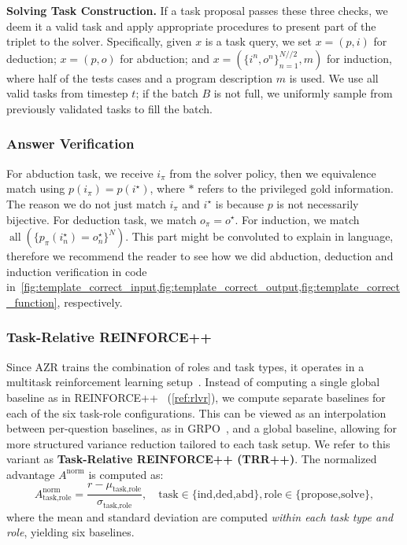 \documentclass{article}
\begin{document}
\textbf{Solving Task Construction.}
If a task proposal passes these three checks, we deem it a valid task and apply appropriate procedures to present part of the triplet to the solver. Specifically, given \(x\) is a task query, we set \(x = (p, i)\) for deduction; \(x = (p, o)\) for abduction; and \(x = (\{i^n, o^n\}^{N // 2}_{n=1}, m)\) for induction, where half of the tests cases and a program description $m$ is used. We use all valid tasks from timestep \(t\); if the batch \(B\) is not full, we uniformly sample from previously validated tasks to fill the batch.

\subsubsection{Answer Verification}
\label{sec:answer_verification}
For abduction task, we receive \(i_\pi\) from the solver policy, then we equivalence match using \(p(i_\pi)=p(i^\star)\), where \(*\) refers to the privileged gold information. The reason we do not just match \(i_\pi\) and \(i^\star\) is because \(p\) is not necessarily bijective. For deduction task, we match \(o_\pi=o^\star\). For induction, we match \(\operatorname{all}(\{p_\pi(i_n^\star)=o_n^\star\}^N)\). This part might be convoluted to explain in language, therefore we recommend the reader to see how we did abduction, deduction and induction verification in code in~\cref{fig:template_correct_input,fig:template_correct_output,fig:template_correct_function}, respectively.

\subsubsection{Task-Relative REINFORCE++}
\label{sec:trr}

Since AZR trains the combination of roles and task types, it operates in a multitask reinforcement learning setup~\citep{zhang2021survey,zhao2022mixture,wang2023train, yue2023understanding}. Instead of computing a single global baseline as in REINFORCE++~\citep{hu2025reinforce++} (\cref{ref:rlvr}), we compute separate baselines for each of the six task-role configurations. This can be viewed as an interpolation between per-question baselines, as in GRPO~\citep{Shao2024DeepSeekMathPT}, and a global baseline, allowing for more structured variance reduction tailored to each task setup. We refer to this variant as \textbf{Task-Relative REINFORCE++ (TRR++)}. The normalized advantage \(A^\text{norm}\) is computed as:
\begin{equation}
A^{\text{norm}}_{\text{task,role}} = \frac{r - \mu_{\text{task,role}}}{\sigma_{\text{task,role}}},\quad\text{task}\in\{\text{ind,ded,abd}\},\text{role}\in\{\text{propose,solve}\},
\end{equation}
where the mean and standard deviation are computed \emph{within each task type and role}, yielding six baselines.
\end{document}
